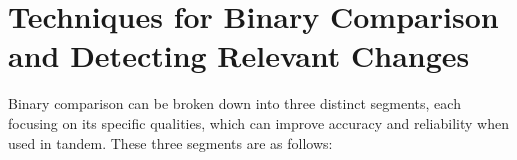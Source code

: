 \section{Techniques for Binary Comparison and Detecting Relevant Changes}
\label{sec:background:comparing_binaries}

Binary comparison can be broken down into three distinct segments, each focusing on its specific qualities, which can improve accuracy and reliability when used in tandem. These three segments are as follows:

